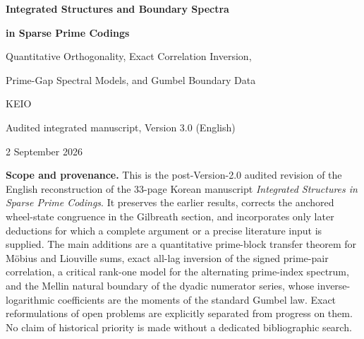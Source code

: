 \documentclass[11pt]{article}
\theoremstyle{definition}
\theoremstyle{remark}
\begin{document}
\hypersetup{pageanchor=false}

\begin{titlepage}
\centering
\vspace*{1.15in}
{\huge\bfseries\color{ink} Integrated Structures and Boundary Spectra\par}
\vspace{0.12in}
{\huge\bfseries\color{ink} in Sparse Prime Codings\par}
\vspace{0.35in}
{\Large Quantitative Orthogonality, Exact Correlation Inversion,\par
Prime-Gap Spectral Models, and Gumbel Boundary Data\par}
\vspace{0.8in}
{\large KEIO\par}
\vspace{0.25in}
{\large Audited integrated manuscript, Version 3.0 (English)\par}
\vspace{0.1in}
{\large 2 September 2026\par}
\vfill
\begin{minipage}{0.86\textwidth}
\small
\textbf{Scope and provenance.}
This is the post-Version-2.0 audited revision of the English reconstruction of the
33-page Korean manuscript \emph{Integrated Structures in Sparse Prime Codings}.
It preserves the earlier results, corrects the anchored wheel-state congruence in the
Gilbreath section, and incorporates only later deductions for which a complete argument
or a precise literature input is supplied.  The main additions are a quantitative
prime-block transfer theorem for M\"obius and Liouville sums, exact all-lag inversion of
the signed prime-pair correlation, a critical rank-one model for the alternating
prime-index spectrum, and the Mellin natural boundary of the dyadic numerator series,
whose inverse-logarithmic coefficients are the moments of the standard Gumbel law.
Exact reformulations of open problems are explicitly separated from progress on them.
No claim of historical priority is made without a dedicated bibliographic search.
\end{minipage}
\vfill
\end{titlepage}

\hypersetup{pageanchor=true}
\end{document}
